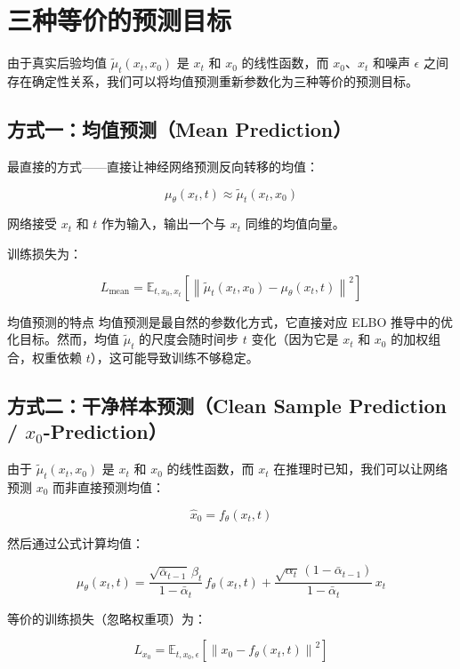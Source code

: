 \section{三种等价的预测目标}

由于真实后验均值 $\tilde{\mu}_t(x_t, x_0)$ 是 $x_t$ 和 $x_0$ 的线性函数，而 $x_0$、$x_t$ 和噪声 $\epsilon$ 之间存在确定性关系，我们可以将均值预测重新参数化为三种等价的预测目标。

\subsection{方式一：均值预测（Mean Prediction）}

最直接的方式——直接让神经网络预测反向转移的均值：

$$\mu_\theta(x_t, t) \approx \tilde{\mu}_t(x_t, x_0)$$

网络接受 $x_t$ 和 $t$ 作为输入，输出一个与 $x_t$ 同维的均值向量。

训练损失为：

$$L_{\text{mean}} = \mathbb{E}_{t, x_0, x_t}\left[\left\| \tilde{\mu}_t(x_t, x_0) - \mu_\theta(x_t, t) \right\|^2\right]$$

\begin{knowledgebox}{均值预测的特点}
均值预测是最自然的参数化方式，它直接对应 ELBO 推导中的优化目标。然而，均值 $\tilde{\mu}_t$ 的尺度会随时间步 $t$ 变化（因为它是 $x_t$ 和 $x_0$ 的加权组合，权重依赖 $t$），这可能导致训练不够稳定。
\end{knowledgebox}

\subsection{方式二：干净样本预测（Clean Sample Prediction / $x_0$-Prediction）}

由于 $\tilde{\mu}_t(x_t, x_0)$ 是 $x_t$ 和 $x_0$ 的线性函数，而 $x_t$ 在推理时已知，我们可以让网络预测 $x_0$ 而非直接预测均值：

$$\hat{x}_0 = f_\theta(x_t, t)$$

然后通过公式计算均值：

$$\mu_\theta(x_t, t) = \frac{\sqrt{\bar{\alpha}_{t-1}}\, \beta_t}{1 - \bar{\alpha}_t}\, f_\theta(x_t, t) + \frac{\sqrt{\alpha_t}\, (1 - \bar{\alpha}_{t-1})}{1 - \bar{\alpha}_t}\, x_t$$

等价的训练损失（忽略权重项）为：

$$L_{x_0} = \mathbb{E}_{t, x_0, \epsilon}\left[\left\| x_0 - f_\theta(x_t, t) \right\|^2\right]$$

